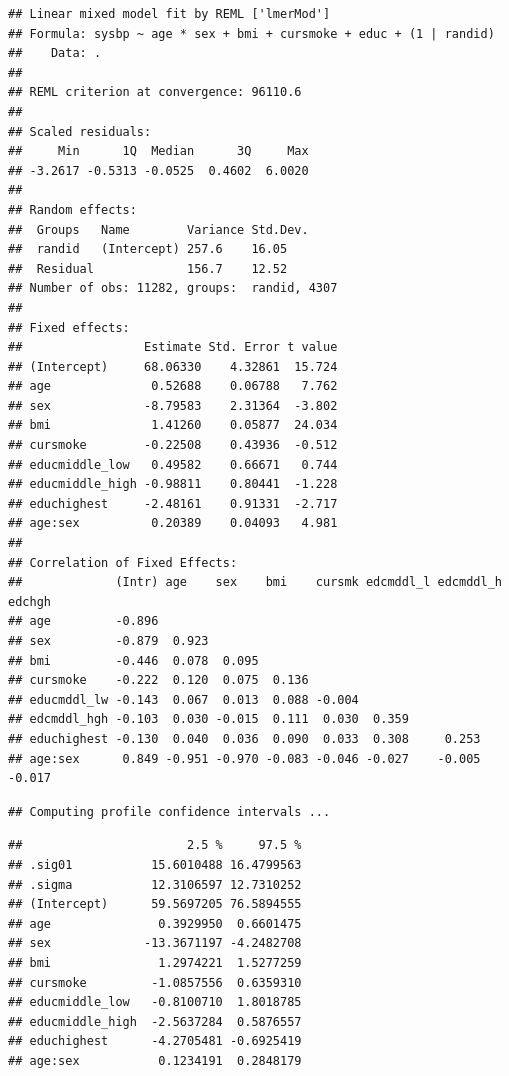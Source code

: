 \documentclass[
]{book}
\newenvironment{Shaded}{\begin{snugshade}}{\end{snugshade}}
\newcommand{\KeywordTok}[1]{\textcolor[rgb]{0.13,0.29,0.53}{\textbf{#1}}}
\newcommand{\NormalTok}[1]{#1}
\newcommand{\OperatorTok}[1]{\textcolor[rgb]{0.81,0.36,0.00}{\textbf{#1}}}
\newcommand{\StringTok}[1]{\textcolor[rgb]{0.31,0.60,0.02}{#1}}
\begin{document}
\begin{verbatim}
## Linear mixed model fit by REML ['lmerMod']
## Formula: sysbp ~ age * sex + bmi + cursmoke + educ + (1 | randid)
##    Data: .
## 
## REML criterion at convergence: 96110.6
## 
## Scaled residuals: 
##     Min      1Q  Median      3Q     Max 
## -3.2617 -0.5313 -0.0525  0.4602  6.0020 
## 
## Random effects:
##  Groups   Name        Variance Std.Dev.
##  randid   (Intercept) 257.6    16.05   
##  Residual             156.7    12.52   
## Number of obs: 11282, groups:  randid, 4307
## 
## Fixed effects:
##                 Estimate Std. Error t value
## (Intercept)     68.06330    4.32861  15.724
## age              0.52688    0.06788   7.762
## sex             -8.79583    2.31364  -3.802
## bmi              1.41260    0.05877  24.034
## cursmoke        -0.22508    0.43936  -0.512
## educmiddle_low   0.49582    0.66671   0.744
## educmiddle_high -0.98811    0.80441  -1.228
## educhighest     -2.48161    0.91331  -2.717
## age:sex          0.20389    0.04093   4.981
## 
## Correlation of Fixed Effects:
##             (Intr) age    sex    bmi    cursmk edcmddl_l edcmddl_h edchgh
## age         -0.896                                                       
## sex         -0.879  0.923                                                
## bmi         -0.446  0.078  0.095                                         
## cursmoke    -0.222  0.120  0.075  0.136                                  
## educmddl_lw -0.143  0.067  0.013  0.088 -0.004                           
## edcmddl_hgh -0.103  0.030 -0.015  0.111  0.030  0.359                    
## educhighest -0.130  0.040  0.036  0.090  0.033  0.308     0.253          
## age:sex      0.849 -0.951 -0.970 -0.083 -0.046 -0.027    -0.005    -0.017
\end{verbatim}

\begin{Shaded}
\end{Shaded}

\begin{verbatim}
## Computing profile confidence intervals ...
\end{verbatim}

\begin{verbatim}
##                       2.5 %     97.5 %
## .sig01           15.6010488 16.4799563
## .sigma           12.3106597 12.7310252
## (Intercept)      59.5697205 76.5894555
## age               0.3929950  0.6601475
## sex             -13.3671197 -4.2482708
## bmi               1.2974221  1.5277259
## cursmoke         -1.0857556  0.6359310
## educmiddle_low   -0.8100710  1.8018785
## educmiddle_high  -2.5637284  0.5876557
## educhighest      -4.2705481 -0.6925419
## age:sex           0.1234191  0.2848179
\end{verbatim}
\end{document}
